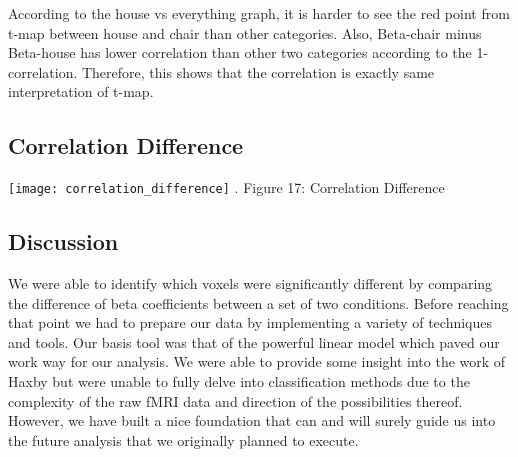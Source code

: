 \documentclass[12pt]{article}
\begin{document}
According to the house vs everything graph, it is harder to see the red point from t-map between house and chair than other categories. Also, Beta-chair  minus Beta-house has lower correlation than other two categories according to the 1-correlation. Therefore,  this shows that the correlation is exactly same interpretation  of t-map. 

\subsection{Correlation Difference}

    \centering
      \texttt{[image: correlation\_difference]}
.                Figure 17: Correlation Difference



\subsection{Discussion}

We were able to identify which voxels were significantly different by comparing the difference of beta coefficients between a set of two conditions. Before reaching that point we had to prepare our data by implementing a variety of techniques and tools.  Our basis tool was that of the powerful linear model which paved our work way for our analysis. We were able to provide some insight into the work of Haxby but were unable to fully delve into classification methods due to the complexity of the raw fMRI data and direction of the possibilities thereof. However, we have built a nice foundation that can and will surely guide us into the future analysis that we originally planned to execute. 


\end{document}
